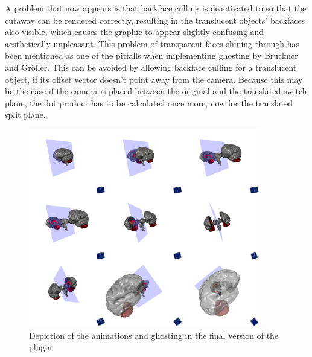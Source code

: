 A problem that now appears is that backface culling is deactivated to so that the cutaway can be rendered correctly, resulting in the translucent objects' backfaces also visible, which causes the graphic to appear slightly confusing and aesthetically unpleasant. This problem of transparent faces shining through has been mentioned as one of the pitfalls when implementing ghosting by Bruckner and Gr\"oller\cite{proc:bruckner-2006-EVV}. This can be avoided by allowing backface culling for a translucent object, if its offset vector doesn't point away from the camera. Because this may be the case if the camera is placed between the original and the translated switch plane, the dot product has to be calculated once more, now for the translated split plane.\\
\begin{figure}[tb]
	\centering
	\includegraphics[width=0.9\textwidth]{chapters/figures/brainstem}
	\caption{Depiction of the animations and ghosting in the final version of the plugin}
	\label{fig:brainstem}
\end{figure}
